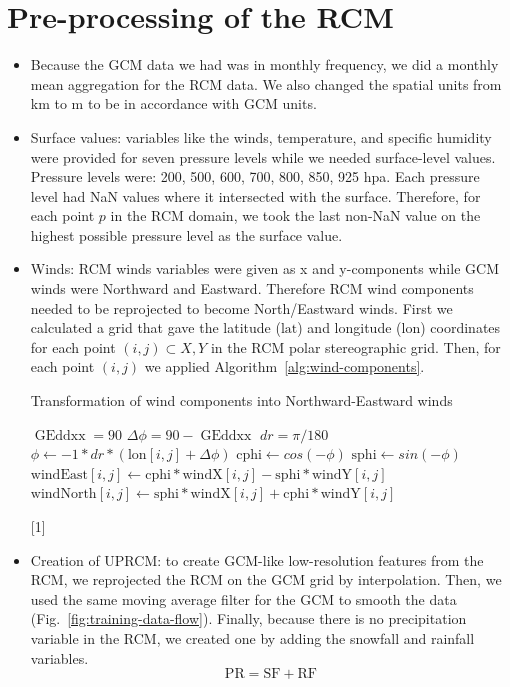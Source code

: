 \documentclass[a4paper,11pt,oneside]{report}
\begin{document}
\section{Pre-processing of the RCM}\label{sec:preproc-RCM}
\begin{itemize}
    \item Because the GCM data we had was in monthly frequency, we did a monthly mean aggregation for the RCM data. We also changed the spatial units from \si{km} to \si{m} to be in accordance with GCM units. 
    \item Surface values: variables like the winds, temperature, and specific humidity were provided for seven pressure levels while we needed surface-level values. Pressure levels were: 200, 500, 600, 700, 800, 850, 925 \si{hpa}. Each pressure level had NaN values where it intersected with the surface. Therefore, for each point $p$ in the RCM domain, we took the last non-NaN value on the highest possible pressure level as the surface value.  
    \item Winds: RCM winds variables were given as x and y-components while GCM winds were Northward and Eastward. Therefore RCM wind components needed to be reprojected to become North/Eastward winds. First we calculated a grid that gave the latitude ($\mathrm{lat}$) and longitude ($\mathrm{lon}$) coordinates for each point $(i,j)\subset X,Y $ in the RCM polar stereographic grid. Then, for each point $(i,j)$ we applied Algorithm~\ref{alg:wind-components}.  
    
    \begin{algorithm}
    \caption{Transformation of wind components into Northward-Eastward winds}\label{alg:wind-components}
    \begin{algorithmic}[1]
    \State $\operatorname{GEddxx} = 90$
    \State $\Delta \phi = 90 - \operatorname{GEddxx}$
    \State $dr = \pi / 180$ 
    \State $\phi \gets -1*dr*(\mathrm{lon}[i,j] + \Delta \phi)$
    \State $\mathrm{cphi} \gets cos(-\phi)$
    \State $\mathrm{sphi} \gets sin(-\phi)$
    \State  $\mathrm{windEast}[i, j] \gets \mathrm{cphi} * \mathrm{windX}[i, j] - \mathrm{sphi} * \mathrm{windY}[i,j]$ 
    \State $\mathrm{windNorth}[i, j] \gets  \mathrm{sphi} * \mathrm{windX}[i, j] + \mathrm{cphi} * \mathrm{windY}[i, j]$ 
    \EndFor
    \end{algorithmic}[1]
    \end{algorithm}
    
    \item Creation of UPRCM: to create GCM-like low-resolution features from the RCM, we reprojected the RCM on the GCM grid by interpolation. Then, we used the same moving average filter for the GCM to smooth the data (Fig.~\ref{fig:training-data-flow}). Finally, because there is no precipitation variable in the RCM, we created one by adding the snowfall and rainfall variables. 
    \begin{equation}
        \mathrm{PR} = \mathrm{SF} + \mathrm{RF}
    \end{equation}
\end{itemize}
\end{document}
